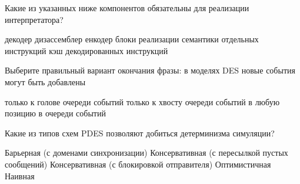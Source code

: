 \documentclass[a4paper, addpoints]{exam}
\begin{document}
\begin{questions}



\question[1] Какие из указанных ниже компонентов обязательны для реализации интерпретатора?
\begin{choices}
    \correctchoice декодер
    \choice дизассемблер
    \choice енкодер
    \correctchoice блоки реализации семантики отдельных инструкций
    \choice кэш декодированных инструкций
\end{choices}

\question[1] Выберите правильный вариант окончания фразы: в моделях DES новые события могут быть добавлены
\begin{choices}
    \choice только к голове очереди событий
    \choice только к хвосту очереди событий
    \correctchoice в любую позицию в очереди событий
\end{choices}


\question[1] Какие из типов схем PDES позволяют добиться детерминизма симуляции?
\begin{choices}
    \correctchoice Барьерная (с доменами синхронизации)
    \choice Консервативная (с пересылкой пустых сообщений)
    \choice Консервативная (с блокировкой отправителя)
    \choice Оптимистичная
    \choice Наивная
\end{choices}





\end{questions}
\end{document}
